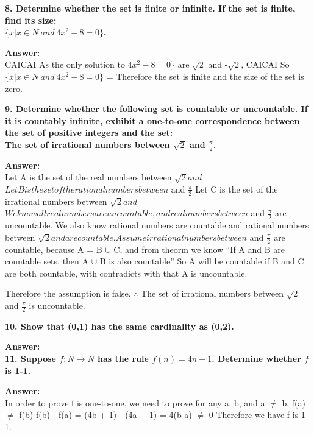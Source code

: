 \documentclass{article}
\begin{document}
\begin{large}
\textbf{8. Determine whether the set is finite or infinite. If the set is finite, find its size:\\
\indent$\{x|x\in N\ and\ 4{x^{2}}-8=0\}$.}

\textbf{Answer:} \\
                                              CAICAI
As the only solution to $4{x^{2}}-8=0\}$ are $\sqrt 2$ and -$\sqrt 2$, 
                                       CAICAI
So $\{x|x\in N\ and\ 4{x^{2}}-8=0\}$ = {\none}
Therefore the set is finite and the size of the set is zero.


\textbf{9. Determine whether the following set is countable or uncountable. If it is countably infinite, exhibit a one-to-one correspondence between the set of positive integers and the set:\\
The set of irrational numbers between $\sqrt{2}$ and $\frac{\pi}{2}$.}

\textbf{Answer:} \\

Let A is the set of the real numbers between $\sqrt{2} and $$
Let B is the set of the rational numbers between $ and $\frac{\pi}{2}$
Let C is the set of the irrational numbers between $\sqrt{2} and $$

We know all real numbers are uncountable, and real numbers between $ and $\frac{\pi}{2}$ are uncountable.
We also know rational numbers are countable and rational numbers between $\sqrt{2} and $$ are countable.

Assume irrational numbers between $ and $\frac{\pi}{2}$ are countable, 
because A = B $\cup$ C, and from theorm we know ``If A and B are countable sets, then A $\cup$ B is also countable''
So A will be countable if B and C are both countable, with contradicts with that A is uncountable.

Therefore the assumption is false. 
$\therefore$ The set of irrational numbers between $\sqrt{2}$ and $\frac{\pi}{2}$ is uncountable.


\textbf{10. Show that (0,1) has the same cardinality as (0,2).}

\textbf{Answer:} \\



\textbf{11. Suppose $f:N\to N$ has the rule $f(n)=4n+1$. Determine whether $f$ is 1-1.}

\textbf{Answer:} \\

In order to prove f is one-to-one, we need to prove for any a, b, and a $\neq$ b, f(a) $\neq$ f(b)
f(b) - f(a) = (4b + 1) - (4a + 1) = 4(b-a) $\neq$ 0
Therefore we have f is 1-1.



\end{large}
\end{document}
